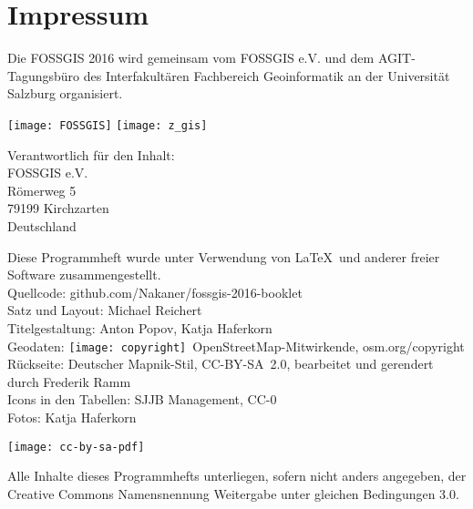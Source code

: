 \newpage
\section*{Impressum}
\label{impressum}


\RaggedRight
Die FOSSGIS 2016 wird gemeinsam vom FOSSGIS e.V. und dem AGIT-Tagungsbüro des Interfakultären Fachbereich Geoinformatik an der Universität Salzburg organisiert.

\vspace{0.5em}
	\texttt{[image: FOSSGIS]}
	\hfill
	\texttt{[image: z\_gis]}

\vspace{0.5em}
{\small\noindent Verantwortlich für den Inhalt:\\
FOSSGIS e.V.\\
Römerweg 5\\
79199 Kirchzarten\\
Deutschland

\vspace{0.5em}
\noindent Diese Programmheft wurde unter Verwendung von \LaTeX\ und 
anderer freier Software zusammengestellt.\\
 Quellcode: github.com/Nakaner/fossgis-2016-booklet\\
\noindent Satz und Layout: Michael Reichert\\
Titelgestaltung: Anton Popov, Katja Haferkorn\\
Geodaten: \texttt{[image: copyright]}~Open\-Street\-Map-Mitwirkende, osm.org/copyright\\
Rückseite: Deutscher Mapnik-Stil, CC-BY-SA~2.0, bearbeitet und gerendert durch Frederik Ramm\\
Icons in den Tabellen: SJJB Management, CC-0\\
Fotos: Katja Haferkorn\\
}

\vspace{1em}
\noindent \begin{minipage}[htbp]{0.2\textwidth}
\noindent\texttt{[image: cc-by-sa-pdf]}
\end{minipage}
\hfill
\begin{minipage}[hbtp]{0.74\textwidth}\RaggedRight
Alle Inhalte dieses Programmhefts unterliegen, sofern nicht anders angegeben, 
der Creative Commons Namensnennung Weitergabe unter gleichen Bedingungen 3.0.
\end{minipage}



